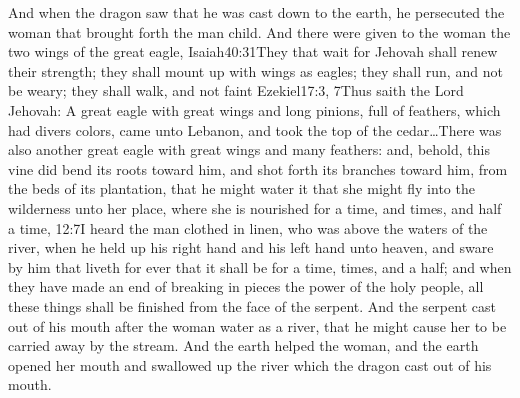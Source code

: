  And when the dragon saw that he was cast down to the earth, he persecuted the woman that brought forth the man child. 
 And there were given to the woman the two wings of the great eagle,%
				   {Isaiah}{40:31}{They that wait for Jehovah shall renew their strength; they shall mount up with wings as eagles; they shall run, and not be weary; they shall walk, and not faint}%
				   {Ezekiel}{17:3, 7}{Thus saith the Lord Jehovah: A great eagle with great wings and long pinions, full of feathers, which had divers colors, came unto Lebanon, and took the top of the cedar\ldots There was also another great eagle with great wings and many feathers: and, behold, this vine did bend its roots toward him, and shot forth its branches toward him, from the beds of its plantation, that he might water it}
 that she might fly into the wilderness unto her place, where she is nourished for a time, and times, and half a time,%
				    {12:7}{I heard the man clothed in linen, who was above the waters of the river, when he held up his right hand and his left hand unto heaven, and sware by him that liveth for ever that it shall be for a time, times, and a half; and when they have made an end of breaking in pieces the power of the holy people, all these things shall be finished}
 from the face of the serpent. 
 And the serpent cast out of his mouth after the woman water as a river, that he might cause her to be carried away by the stream. 
 And the earth helped the woman, and the earth opened her mouth and swallowed up the river which the dragon cast out of his mouth.%
